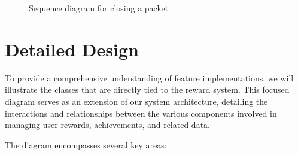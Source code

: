 \begin{landscape}
    \begin{figure}[H]
        \centering
        \caption{Sequence diagram for closing a packet}
        \label{fig:seq-close-packet}
    \end{figure}
\end{landscape}


\section{Detailed Design}
To provide a comprehensive understanding of feature implementations, we will illustrate the classes that are directly tied to the reward system. This focused diagram serves as an extension of our system architecture, detailing the interactions and relationships between the various components involved in managing user rewards, achievements, and related data. 

The diagram encompasses several key areas:

